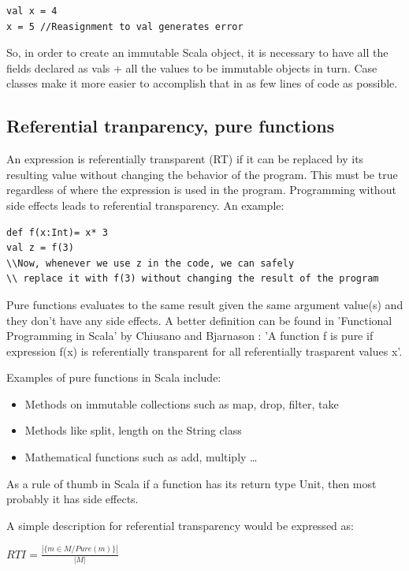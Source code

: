 \documentclass{article}
\begin{document}
\begin{lstlisting} 
val x = 4
x = 5 //Reasignment to val generates error
\end{lstlisting}


So, in order to create an immutable Scala object, it is necessary to have all the fields declared as vals + all the values to be immutable objects in turn. Case classes make it more easier to accomplish that in as few lines of code as possible.

\subsection {Referential tranparency, pure functions}
An expression is referentially transparent (RT) if it can be replaced by its resulting value without changing the behavior of the program. This must be true regardless of where the expression is used in the program. Programming without side effects leads to referential transparency. An example:

\begin{lstlisting}
def f(x:Int)= x* 3
val z = f(3)
\\Now, whenever we use z in the code, we can safely
\\ replace it with f(3) without changing the result of the program
\end{lstlisting}

Pure functions evaluates to the same result given the same argument value(s) and they don't have any side effects. A better definition can be found in 'Functional Programming in Scala' by Chiusano and Bjarnason : 'A function f is pure if expression f(x) is referentially transparent for all referentially trasparent values x'.\par
Examples of pure functions in Scala include:
\begin{itemize}

 \item Methods on immutable collections such as map, drop, filter, take
 \item Methods like split, length on the String class
 \item Mathematical functions such as add, multiply \ldots
\end{itemize}
As a rule of thumb in Scala if a function has its return type Unit, then most probably it has side effects. \par

A simple description for referential transparency would be expressed as:  \par
\begin{center}
\begin{math}
  RTI = \frac{ | \{ m \in M / Pure(m) \} | } { | M | }
\end{math}
\end{center}
\end{document}
